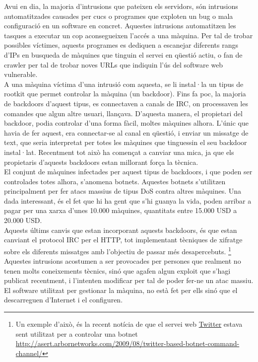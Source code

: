 Avui en dia, la majoria d'intrusions que pateixen els servidors, són intrusions automatitzades causades per cucs o 
programes que exploten un bug o mala configuració en un software en concret. Aquestes intrusions automatitzen les 
tasques a executar un cop aconsegueixen l'accés a una màquina. Per tal de trobar possibles víctimes, aquests programes
es dediquen a escanejar diferents rangs d'IPs en busqueda de màquines que tinguin el servei en qüestió actiu, o 
fan de crawler per tal de trobar noves URLs que indiquin l'ús del software web vulnerable. \\

A una màquina víctima d'una intrusió com aquesta, se li instal·la un tipus de rootkit que permet controlar 
la màquina (un backdoor). Fins fa poc, la majoria de backdoors d'aquest tipus,  es connectaven a canals de IRC, on 
processaven les comandes que algun altre usuari, llançava. D'aquesta manera, el propietari del backdoor, podia controlar 
d'una forma fàcil, moltes màquines alhora. L'únic que havia de fer aquest, era connectar-se al canal en qüestió, i 
enviar un missatge de text, que seria interpretat per totes les màquines que tinguessin el seu backdoor instal·lat. 
Recentment tot això ha començat a canviar una mica, ja que els propietaris d'aquests backdoors estan millorant força la tècnica. \\

El conjunt de màquines infectades per aquest tipus de backdoors, i que poden ser controlades totes alhora, s'anomena
botnets. Aquestes botnets s'utilitzen principalment per fer atacs massius de tipus DoS contra altres màquines. 
Una dada interessant, és el fet que hi ha gent que s'hi guanya la vida, poden arribar a pagar per una xarxa d'unes
10.000 màquines, quantitats entre 15.000 USD a 20.000 USD. \\

Aquests últims canvis que estan incorporant aquests backdoors, és que estan canviant el protocol IRC per el HTTP,
tot implementant tècniques de xifratge sobre els diferents missatges amb l'objectiu de passar més desapercebuts. 
\footnote{Un exemple d'això, és la recent notícia de que el servei web \href{http://twitter.com/}{Twitter} estava sent 
utilitzat per a controlar una botnet \url{http://asert.arbornetworks.com/2009/08/twitter-based-botnet-command-channel/}} \\

Aquestes intrusions acostumen a ser provocades per persones que realment no tenen molts coneixements tècnics, sinó que 
agafen algun exploit que s'hagi publicat recentment, i l'intenten modificar per tal de poder fer-ne un atac massiu. El
software utilitzat per gestionar la màquina, no està fet per ells sinó que el descarreguen d'Internet i el configuren. \\

